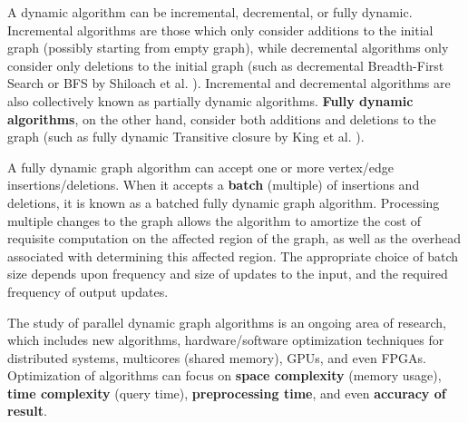 


A dynamic algorithm can be incremental, decremental, or fully dynamic. Incremental algorithms are those which only consider additions to the initial graph (possibly starting from empty graph), while decremental algorithms only consider only deletions to the initial graph (such as decremental Breadth-First Search or BFS by Shiloach et al. \cite{bfs-shiloach81}). Incremental and decremental algorithms are also collectively known as partially dynamic algorithms. \textbf{Fully dynamic algorithms}, on the other hand, consider both additions and deletions to the graph \cite{graph-italiano99} (such as fully dynamic Transitive closure by King et al. \cite{closure-king08}).

A fully dynamic graph algorithm can accept one or more vertex/edge insertions/deletions. When it accepts a \textbf{batch} (multiple) of insertions and deletions, it is known as a batched fully dynamic graph algorithm. Processing multiple changes to the graph allows the algorithm to amortize the cost of requisite computation on the affected region of the graph, as well as the overhead associated with determining this affected region. The appropriate choice of batch size depends upon frequency and size of updates to the input, and the required frequency of output updates.

The study of parallel dynamic graph algorithms is an ongoing area of research, which includes new algorithms, hardware/software optimization techniques for distributed systems, multicores (shared memory), GPUs, and even FPGAs. Optimization of algorithms can focus on \textbf{space complexity} (memory usage), \textbf{time complexity} (query time), \textbf{preprocessing time}, and even \textbf{accuracy of result}.


